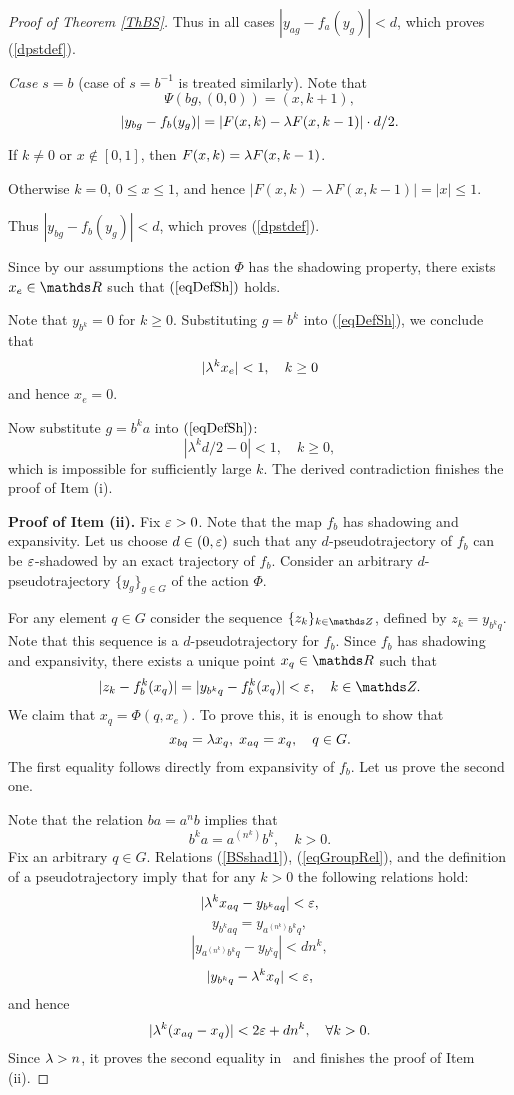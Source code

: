 \begin{proof}[Proof of Theorem \ref{ThBS}]
Thus in all cases
$|y_{ag} - f_a(y_g)| < d$, which proves (\ref{dpstdef}).

\textit{Case $s = b$} (case of $s=b^{-1}$ is treated similarly). Note that
$$\Psi(bg, (0, 0)) = (x, k+1),$$
$$
|y_{bg} - f_b(y_g)| = |F(x, k) - \lambda F(x, k-1)|\cdot d/2.
$$

If $k \ne 0$ or $x \notin [0, 1]$, then $F(x, k) = \lambda F(x, k-1)$.

Otherwise $k = 0$, $0\leq x\leq 1$, and hence
$|F(x,k) - \lambda F(x,k-1)| = |x|\leq1.$


Thus $|y_{bg} - f_b(y_g)| < d$, which proves (\ref{dpstdef}).

Since by our assumptions the action $\Phi$ has the shadowing property, there exists $x_e \in \RR$ such that
$(\ref{eqDefSh})$ holds.

Note that $y_{b^k} = 0$ for $k \geq 0$. Substituting $g = b^k$ into (\ref{eqDefSh}), we conclude that
$$
|\lambda^k x_e| < 1, \quad k \geq 0
$$
and hence $x_e = 0$.

Now substitute $g = b^k a$ into $(\ref{eqDefSh})$:
$$
|\lambda^kd/2 - 0|<1, \quad k  \geq 0,
$$
which is impossible for sufficiently large $k$.
The derived contradiction finishes the proof of Item (i).

\medskip

\textbf{Proof of Item (ii).} Fix $\varepsilon > 0$. Note that the map $f_b$ has shadowing and expansivity. Let us choose $d \in (0, \varepsilon)$ such that any $d$-pseudotrajectory of $f_b$ can be $\varepsilon$-shadowed by an exact trajectory of $f_b$. Consider an arbitrary $d$-pseudotrajectory $\{y_g\}_{g \in G}$ of the action $\Phi$.

For any element $q\in G$ consider the sequence $\{z_k\}_{k\in \ZZ}$, defined by $z_k= y_{b^k q}$. Note that this sequence is a $d$-pseudotrajectory for $f_b$. Since $f_b$ has shadowing and expansivity, there exists a unique point $x_q\in \RR$ such that
\begin{equation}
\label{BSshad1}
|z_k - f_b^k(x_q)|=|y_{b^k q}-f_{b}^k(x_q)| < \ep, \quad k \in \ZZ.
\end{equation}
We claim that $x_q = \Phi(q, x_e)$. To prove this, it is enough to show that
\begin{equation}\label{eqBSshad2}
x_{bq} = \lambda x_q, \; x_{aq} = x_q, \quad q \in G.
\end{equation}
The first equality follows directly from expansivity of $f_b$. Let us prove the second one.

Note that the relation $ba = a^n b$ implies that \begin{equation}\label{eqGroupRel}
b^ka = a^{(n^k)}b^k, \quad k > 0.
\end{equation}
Fix an arbitrary $q \in G$. Relations (\ref{BSshad1}), (\ref{eqGroupRel}), and the definition of a pseudotrajectory imply that for any $k > 0$ the following relations hold:
$$
|\lambda^k x_{aq} - y_{b^kaq}| < \varepsilon,
$$
$$
y_{b^kaq} = y_{a^{(n^k)}b^kq},
$$
$$
|y_{a^{(n^k)}b^kq} - y_{b^kq}| < d n^k,
$$
$$
|y_{b^kq} - \lambda^k x_q| < \varepsilon,
$$
and hence
$$
|\lambda^k(x_{aq} - x_q)| < 2\varepsilon + d n^k, \quad\forall k > 0.
$$
Since $\lambda > n$, it proves the second equality in~ and finishes the proof of Item (ii).

\end{proof}
